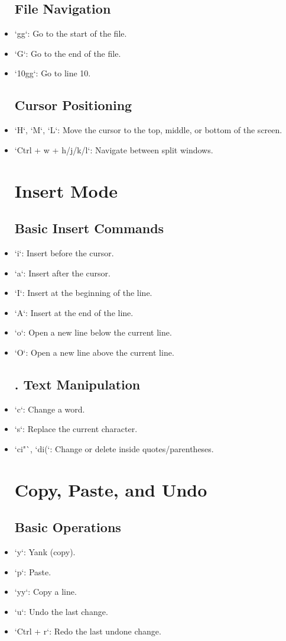 \documentclass{report}
\begin{document}
\begin{itemize}
	\subsection{File Navigation}
\item `gg`: Go to the start of the file.
\item `G`: Go to the end of the file.
\item `10gg`: Go to line 10.
	\subsection{Cursor Positioning}
\item `H`, `M`, `L`: Move the cursor to the top, middle, or bottom of the screen.
\item `Ctrl + w + h/j/k/l`: Navigate between split windows.
	\section{Insert Mode}
	\subsection{Basic Insert Commands}
\item `i`: Insert before the cursor.
\item `a`: Insert after the cursor.
\item `I`: Insert at the beginning of the line.
\item `A`: Insert at the end of the line.
\item `o`: Open a new line below the current line.
\item `O`: Open a new line above the current line.	
	\subsection{. Text Manipulation}
\item `c`: Change a word.
\item `s`: Replace the current character.
\item `ci"`, `di(`: Change or delete inside quotes/parentheses.
	\section{Copy, Paste, and Undo}

	\subsection{Basic Operations}
\item `y`: Yank (copy).
\item `p`: Paste.
\item `yy`: Copy a line.
\item `u`: Undo the last change.
\item `Ctrl + r`: Redo the last undone change.

\end{itemize}
\end{document}
